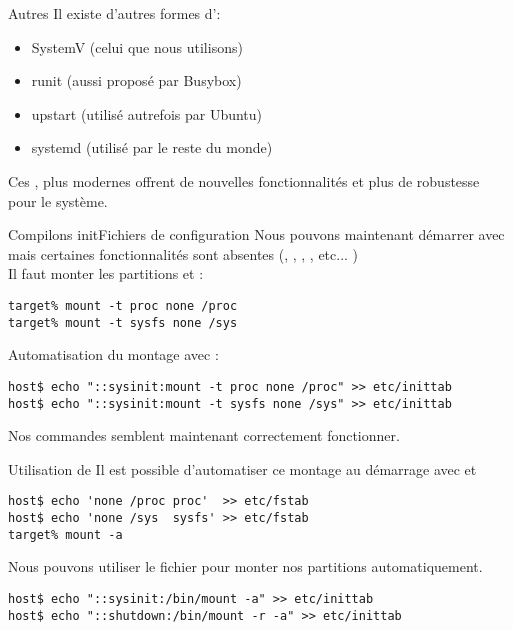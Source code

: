 \begin{frame}[fragile=singleslide]{Autres }
  Il existe d'autres formes d':
  \begin{itemize}
  \item SystemV (celui que nous utilisons)
  \item runit (aussi proposé par Busybox)
  \item upstart (utilisé autrefois par Ubuntu)
  \item systemd (utilisé par le reste du monde)
  \end{itemize}
  Ces ,  plus modernes  offrent de nouvelles  fonctionnalités et
  plus de robustesse pour le système.
\end{frame}

\begin{frame}[fragile=singleslide]{Compilons init}{Fichiers de configuration}
  Nous  pouvons  maintenant  démarrer avec    mais
  certaines fonctionnalités sont absentes (, , 
  , , etc... )\\
  Il faut monter les partitions  et :
  \begin{lstlisting}
target% mount -t proc none /proc 
target% mount -t sysfs none /sys
  \end{lstlisting}
  Automatisation du montage avec :
  \begin{lstlisting}
host$ echo "::sysinit:mount -t proc none /proc" >> etc/inittab 
host$ echo "::sysinit:mount -t sysfs none /sys" >> etc/inittab 
  \end{lstlisting}
  Nos commandes semblent maintenant correctement fonctionner.
\end{frame}

\begin{frame}[fragile=singleslide]{Utilisation de }
  Il  est   possible  d'automatiser  ce  montage   au  démarrage  avec
   et 
  \begin{lstlisting}
host$ echo 'none /proc proc'  >> etc/fstab
host$ echo 'none /sys  sysfs' >> etc/fstab
target% mount -a
  \end{lstlisting}

  Nous pouvons utiliser le  fichier  pour monter nos
  partitions automatiquement.
  \begin{lstlisting}
host$ echo "::sysinit:/bin/mount -a" >> etc/inittab 
host$ echo "::shutdown:/bin/mount -r -a" >> etc/inittab 
  \end{lstlisting}
\end{frame}

